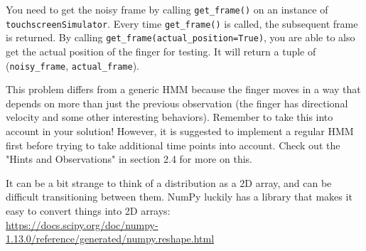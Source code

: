 \documentclass{article}
\begin{document}
You need to get the noisy frame by calling \texttt{get\_frame()} on an instance of \texttt{touchscreenSimulator}. Every time \texttt{get\_frame()} is called, the subsequent frame is returned. By calling \texttt{get\_frame(actual\_position=True)}, you are able to also get the actual position of the finger for testing. It will return a tuple of (\texttt{noisy\_frame}, \texttt{actual\_frame}).

This problem differs from a generic HMM because the finger moves in a way that depends on more than just the previous observation (the finger has directional velocity and some other interesting behaviors). Remember to take this into account in your solution! However, it is suggested to implement a regular HMM first before trying to take additional time points into account. Check out the "Hints and Observations" in section 2.4 for more on this.

It can be a bit strange to think of a distribution as a 2D array, and can be difficult transitioning between them. NumPy luckily has a library that makes it easy to convert things into 2D arrays:\\
\url{https://docs.scipy.org/doc/numpy-1.13.0/reference/generated/numpy.reshape.html}
\end{document}
